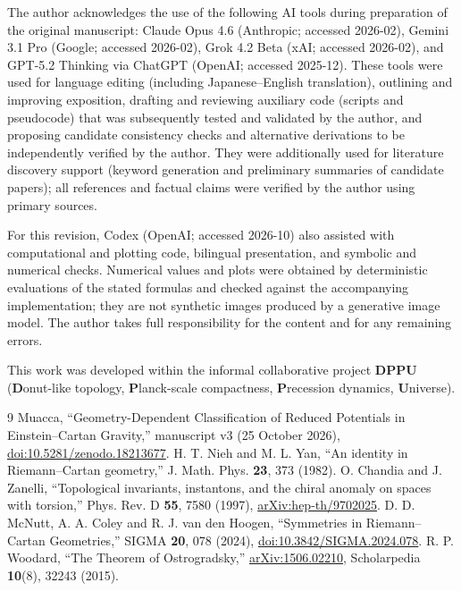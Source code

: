 \documentclass[11pt,a4paper]{article}
\begin{document}
The author acknowledges the use of the following AI tools during preparation of the original
manuscript: Claude Opus 4.6 (Anthropic; accessed 2026-02),
Gemini 3.1 Pro (Google; accessed 2026-02),
Grok 4.2 Beta (xAI; accessed 2026-02), and
GPT-5.2 Thinking via ChatGPT (OpenAI; accessed 2025-12).
These tools were used for language editing (including Japanese--English
translation), outlining and improving exposition, drafting and reviewing
auxiliary code (scripts and pseudocode) that was subsequently tested and
validated by the author, and proposing candidate consistency checks and
alternative derivations to be independently verified by the author. They were
additionally used for literature discovery support (keyword generation and
preliminary summaries of candidate papers); all references and factual claims
were verified by the author using primary sources.

For this revision, Codex (OpenAI; accessed 2026-10) also assisted with
computational and plotting code, bilingual presentation, and symbolic and
numerical checks. Numerical values and plots were obtained by deterministic
evaluations of the stated formulas and checked against the accompanying
implementation; they are not synthetic images produced by a generative
image model. The author takes full responsibility for the content and for
any remaining errors.

This work was developed within the informal collaborative project
\textbf{DPPU} (\textbf{D}onut-like topology, \textbf{P}lanck-scale
compactness, \textbf{P}recession dynamics, \textbf{U}niverse).

\appendix




\begin{thebibliography}{9}
 Muacca, ``Geometry-Dependent Classification of Reduced Potentials in Einstein--Cartan Gravity,'' manuscript v3 (25 October 2026),
\href{https://doi.org/10.5281/zenodo.18213677}{doi:10.5281/zenodo.18213677}.
 H. T. Nieh and M. L. Yan, ``An identity in Riemann--Cartan geometry,''
J. Math. Phys. \textbf{23}, 373 (1982).
 O. Chandia and J. Zanelli, ``Topological invariants, instantons,
and the chiral anomaly on spaces with torsion,'' Phys. Rev. D \textbf{55}, 7580 (1997),
\href{https://arxiv.org/abs/hep-th/9702025}{arXiv:hep-th/9702025}.
 D. D. McNutt, A. A. Coley and R. J. van den Hoogen,
``Symmetries in Riemann--Cartan Geometries,'' SIGMA \textbf{20}, 078 (2024),
\href{https://doi.org/10.3842/SIGMA.2024.078}{doi:10.3842/SIGMA.2024.078}.
 R. P. Woodard, ``The Theorem of Ostrogradsky,''
\href{https://arxiv.org/abs/1506.02210}{arXiv:1506.02210},
Scholarpedia \textbf{10}(8), 32243 (2015).
\end{thebibliography}
\end{document}
